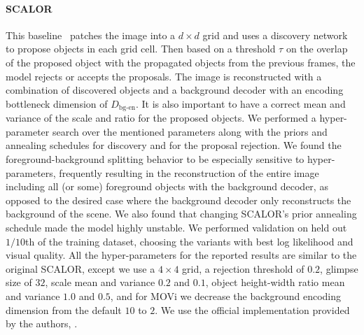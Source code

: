 \documentclass{article}
\begin{document}
\paragraph{SCALOR}
This baseline~\citep{jiang2019scalable} patches the image into a $d\times d$ grid and uses a discovery network to propose objects in each grid cell. Then based on a threshold $\tau$ on the overlap of the proposed object with the propagated objects from the previous frames, the model rejects or accepts the proposals. The image is reconstructed with a combination of discovered objects and a background decoder with an encoding bottleneck dimension of $D_{\text{bg-en}}$. It is also important to have a correct mean and variance of the scale and ratio for the proposed objects. We performed a hyper-parameter search over the mentioned parameters along with the priors and annealing schedules for discovery and for the proposal rejection. We found the foreground-background splitting behavior to be especially sensitive to hyper-parameters, frequently resulting in the reconstruction of the entire image including all (or some) foreground objects with the background decoder, as opposed to the desired case where the background decoder only reconstructs the background of the scene. We also found that changing SCALOR's prior annealing schedule made the model highly unstable. We performed validation on held out $1/10$th of the training dataset, choosing the variants with best log likelihood and visual quality. All the hyper-parameters for the reported results are similar to the original SCALOR, except we use a $4\times 4$ grid, a rejection threshold of $0.2$, glimpse size of $32$, scale mean and variance $0.2$ and $0.1$, object height-width ratio mean and variance $1.0$ and $0.5$, and for MOVi we decrease the background encoding dimension from the default $10$ to $2$. We use the official implementation provided by the authors, \citet{jiang2019scalable}.
\end{document}
